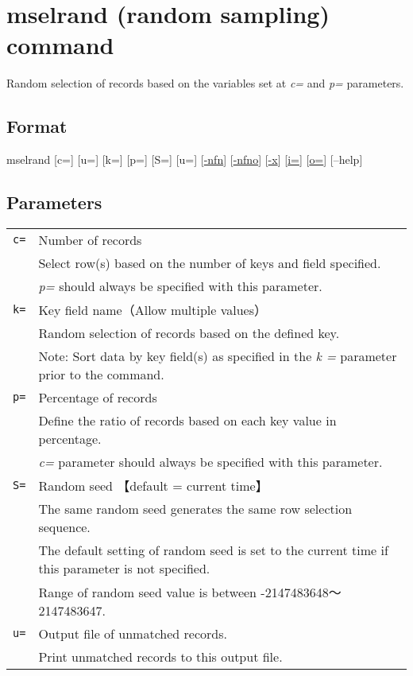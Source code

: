 \documentclass[a4paper]{jarticle}
\begin{document}
\setlength{\baselineskip}{4mm}

\section*{mselrand (random sampling) command}
Random selection of records based on the variables set at \emph{c=} and \emph{p=} parameters. 

\subsection*{Format}
mselrand [c=]  [u=] [k=] [p=] [S=] [u=] [\href{run:option.pdf}{-nfn}] [\href{run:option.pdf}{-nfno}]  [\href{run:option.pdf}{-x}]  [\href{run:option.pdf}{i=}] [\href{run:option.pdf}{o=}] [--help]\\

\subsection*{Parameters}
\begin{table}[htbp]
{\small
\begin{tabular}{ll}
\verb|c=|    & Number of records\\
& Select row(s) based on the number of keys and field specified. \\
& \emph{p=} should always be specified with this parameter. \\
\verb|k=|    & Key field name（Allow multiple values） \\
& Random selection of records based on the defined key.  \\
& Note: Sort data by key field(s) as specified in the \emph{k =} parameter prior to the command. \\
\verb|p=|    & Percentage of records \\
& Define the ratio of records based on each key value in percentage.  \\
& \emph{c=} parameter should always be specified with this parameter.  \\
\verb|S=|    & Random seed 【default = current time】\\
& The same random seed generates the same row selection sequence. \\
& The default setting of random seed is set to the current time if this parameter is not specified.  \\
& Range of random seed value is between -2147483648〜2147483647. \\
\verb|u=|    & Output file of unmatched records. \\
& Print unmatched records to this output file. \\
\end{tabular} 
}
\end{table} 
\end{document}
